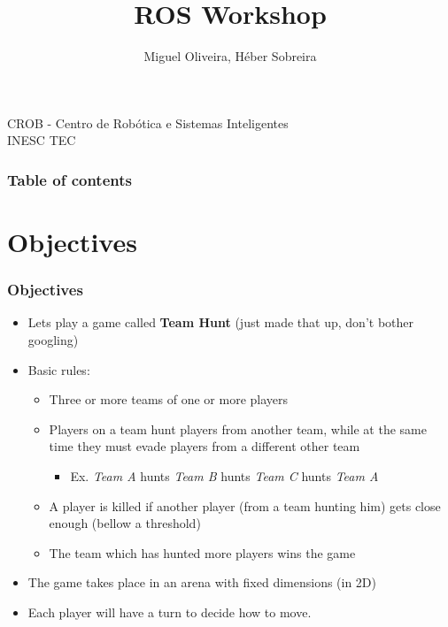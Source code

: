 \documentclass[]{beamer}
\begin{document}
\title{ROS Workshop}  
\author{Miguel Oliveira, H\'{e}ber Sobreira}

\begin{frame}
\titlepage
\scriptsize CROB - Centro de Rob\'{o}tica e Sistemas Inteligentes \\
\scriptsize INESC TEC\\
\end{frame}

\begin{frame}\frametitle{Table of contents}
\scriptsize
\tableofcontents
\end{frame} 


\section{Objectives} 
\begin{frame}\frametitle{Objectives} 
\begin{itemize}
\item Lets play a game called \textbf{Team Hunt} (just made that up, don't
        bother googling)
\item Basic rules: 
\begin{itemize}
\item Three or more teams of one or more players
\item Players on a team hunt players from another team, while at the same
time they must evade players from a different other team
\begin{itemize}
    \item Ex. \textit{Team A} hunts \textit{Team B} hunts \textit{Team C} hunts \textit{Team A}
\end{itemize}
\item A player is killed if another player (from a team hunting him) gets close
enough (bellow a threshold)
\item The team which has hunted more players wins the game
\end{itemize}
\item The game takes place in an arena with fixed dimensions (in 2D)
\item Each player will have a turn to decide how to move.
\end{itemize}
\end{frame}
\end{document}
